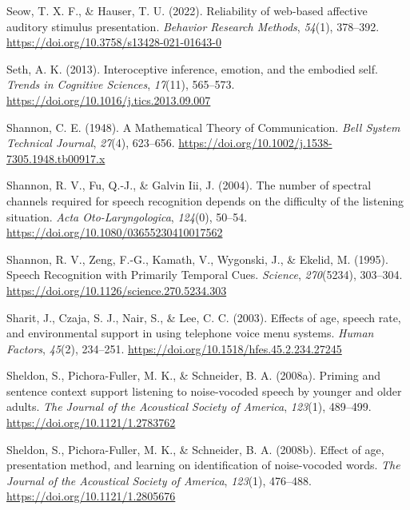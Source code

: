 \documentclass[a4paper, nobind]{templates/ociamthesis}
\newlength{\cslhangindent}
\newenvironment{CSLReferences}[2] %
 {%
  \setlength{\parindent}{0pt}
  \ifodd #1
  \let\oldpar\par
  \def\par{\hangindent=\cslhangindent\oldpar}
  \fi
  \setlength{\parskip}{1mm}
  \setlength{\baselineskip}{6mm}
 }%
 {}
\begin{document}
\begin{CSLReferences}{1}{0}
\leavevmode{}%
Seow, T. X. F., \& Hauser, T. U. (2022). {Reliability of web-based affective auditory stimulus presentation}. \emph{Behavior Research Methods}, \emph{54}(1), 378--392. \url{https://doi.org/10.3758/s13428-021-01643-0}

\leavevmode{}%
Seth, A. K. (2013). Interoceptive inference, emotion, and the embodied self. \emph{Trends in Cognitive Sciences}, \emph{17}(11), 565--573. \url{https://doi.org/10.1016/j.tics.2013.09.007}

\leavevmode{}%
Shannon, C. E. (1948). A Mathematical Theory of Communication. \emph{Bell System Technical Journal}, \emph{27}(4), 623--656. \url{https://doi.org/10.1002/j.1538-7305.1948.tb00917.x}

\leavevmode{}%
Shannon, R. V., Fu, Q.-J., \& Galvin Iii, J. (2004). {The number of spectral channels required for speech recognition depends on the difficulty of the listening situation}. \emph{Acta Oto-Laryngologica}, \emph{124}(0), 50--54. \url{https://doi.org/10.1080/03655230410017562}

\leavevmode{}%
Shannon, R. V., Zeng, F.-G., Kamath, V., Wygonski, J., \& Ekelid, M. (1995). Speech Recognition with Primarily Temporal Cues. \emph{Science}, \emph{270}(5234), 303--304. \url{https://doi.org/10.1126/science.270.5234.303}

\leavevmode{}%
Sharit, J., Czaja, S. J., Nair, S., \& Lee, C. C. (2003). {Effects of age, speech rate, and environmental support in using telephone voice menu systems}. \emph{Human Factors}, \emph{45}(2), 234--251. \url{https://doi.org/10.1518/hfes.45.2.234.27245}

\leavevmode{}%
Sheldon, S., Pichora-Fuller, M. K., \& Schneider, B. A. (2008a). Priming and sentence context support listening to noise-vocoded speech by younger and older adults. \emph{The Journal of the Acoustical Society of America}, \emph{123}(1), 489--499. \url{https://doi.org/10.1121/1.2783762}

\leavevmode{}%
Sheldon, S., Pichora-Fuller, M. K., \& Schneider, B. A. (2008b). Effect of age, presentation method, and learning on identification of noise-vocoded words. \emph{The Journal of the Acoustical Society of America}, \emph{123}(1), 476--488. \url{https://doi.org/10.1121/1.2805676}


\end{CSLReferences}
\end{document}
